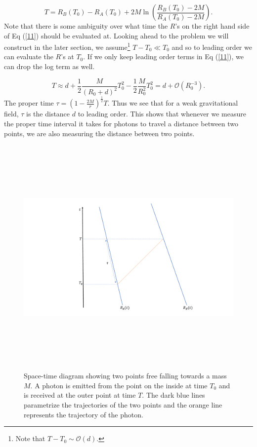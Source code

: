 \documentclass[aps,showpacs,onecolumn,floats,prd,superscriptaddress,nofootinbib]{revtex4-1}
\begin{document}
\begin{equation}
	T = R_B(T_0) - R_A(T_0) + 2M \ln \left( \frac{R_B(T_0) - 2M}{R_A(T_0) - 2M} \right).	\label{11}
\end{equation}
Note that there is some ambiguity over what time the $R$'s on the right hand side of Eq (\ref{11}) should be evaluated at. Looking ahead to the problem we will construct in the later section, we assume\footnote{Note that $T - T_0 \sim \mathcal{O}(d)$.} $T - T_0 \ll T_0$ and so to leading order we can evaluate the $R$'s at $T_0$. If we only keep leading order terms in Eq (\ref{11}), we can drop the log term as well.

\begin{equation}
	T \approx d + \frac{1}{2} \frac{M}{(R_0 + d)^2} T_0^2 - \frac{1}{2} \frac{M}{R_0^2} T_0^2 = d + \mathcal{O}(R_0^{-3}).
\end{equation}
The proper time $\tau = \left( 1- \frac{2M}{r} \right)^\frac{1}{2} T$. Thus we see that for a weak gravitational field, $\tau$ is the distance $d$ to leading order. This shows that whenever we measure the proper time interval it takes for photons to travel a distance between two points, we are also measuring the distance between two points.  

\begin{figure}[h]
\begin{center}
\includegraphics[width =\textwidth, height = 12cm]{time_concept.pdf}
\caption{Space-time diagram showing two points free falling towards a mass $M$. A photon is emitted from the point on the inside at time $T_0$ and is received at the outer point at time $T$. The dark blue lines parametrize the trajectories of the two points and the orange line represents the trajectory of the photon. }
\label{fig:3}
\end{center}
\end{figure}
\end{document}
